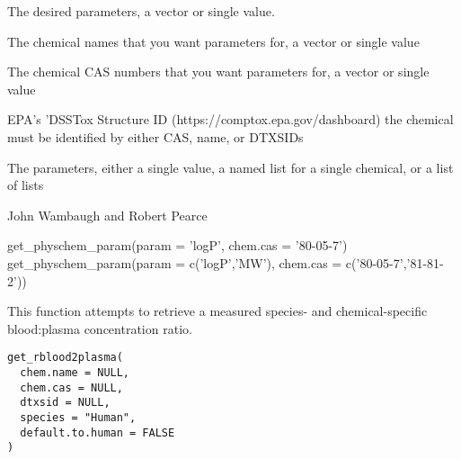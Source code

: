 \documentclass[a4paper]{book}
\begin{document}
%
\begin{Arguments}
\begin{ldescription}
\item[\code{param}] The desired parameters, a vector or single value.

\item[\code{chem.name}] The chemical names that you want parameters for, a vector or single value

\item[\code{chem.cas}] The chemical CAS numbers that you want parameters for, a vector or single value

\item[\code{dtxsid}] EPA's 'DSSTox Structure ID (https://comptox.epa.gov/dashboard)
the chemical must be identified by either CAS, name, or DTXSIDs
\end{ldescription}
\end{Arguments}
%
\begin{Value}
The parameters, either a single value, a named list for a single chemical, or a list of lists
\end{Value}
%
\begin{Author}\relax
John Wambaugh and Robert Pearce
\end{Author}
%
\begin{Examples}
\begin{ExampleCode}

get_physchem_param(param = 'logP', chem.cas = '80-05-7')
get_physchem_param(param = c('logP','MW'), chem.cas = c('80-05-7','81-81-2'))


\end{ExampleCode}
\end{Examples}
%
\begin{Description}\relax
This function attempts to retrieve a measured species- and chemical-specific 
blood:plasma concentration ratio.
\end{Description}
%
\begin{Usage}
\begin{verbatim}
get_rblood2plasma(
  chem.name = NULL,
  chem.cas = NULL,
  dtxsid = NULL,
  species = "Human",
  default.to.human = FALSE
)
\end{verbatim}
\end{Usage}
%
\end{document}
